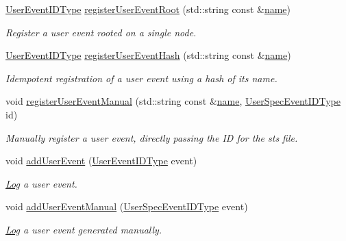\begin{DoxyCompactItemize}
\hyperlink{namespacevt_1_1trace_a5908920d051c144c89f17c69ed262350}{User\+Event\+I\+D\+Type} \hyperlink{structvt_1_1trace_1_1_trace_a99fcca49a5506c3ee5cda67e541e37cc}{register\+User\+Event\+Root} (std\+::string const \&\hyperlink{structvt_1_1trace_1_1_trace_aaae4bbf6d009229a5c8b9db67a127942}{name})
\begin{DoxyCompactList}\small\item\em Register a user event rooted on a single node. \end{DoxyCompactList}\item 
\hyperlink{namespacevt_1_1trace_a5908920d051c144c89f17c69ed262350}{User\+Event\+I\+D\+Type} \hyperlink{structvt_1_1trace_1_1_trace_a1b80a8ca6bebbfbe61f8b119342e14f7}{register\+User\+Event\+Hash} (std\+::string const \&\hyperlink{structvt_1_1trace_1_1_trace_aaae4bbf6d009229a5c8b9db67a127942}{name})
\begin{DoxyCompactList}\small\item\em Idempotent registration of a user event using a hash of its name. \end{DoxyCompactList}\item 
void \hyperlink{structvt_1_1trace_1_1_trace_ade8d39718f60924f1aeb178ccda56cbc}{register\+User\+Event\+Manual} (std\+::string const \&\hyperlink{structvt_1_1trace_1_1_trace_aaae4bbf6d009229a5c8b9db67a127942}{name}, \hyperlink{namespacevt_1_1trace_a70c43e0e1596eea236912d4197d3120a}{User\+Spec\+Event\+I\+D\+Type} id)
\begin{DoxyCompactList}\small\item\em Manually register a user event, directly passing the ID for the sts file. \end{DoxyCompactList}\item 
void \hyperlink{structvt_1_1trace_1_1_trace_a0a4bbdf7bd3c2b8742cbceb24389a4c0}{add\+User\+Event} (\hyperlink{namespacevt_1_1trace_a5908920d051c144c89f17c69ed262350}{User\+Event\+I\+D\+Type} event)
\begin{DoxyCompactList}\small\item\em \hyperlink{structvt_1_1trace_1_1_log}{Log} a user event. \end{DoxyCompactList}\item 
void \hyperlink{structvt_1_1trace_1_1_trace_a2d9fac6bd71ba67e4f87b7efd7c6c6c7}{add\+User\+Event\+Manual} (\hyperlink{namespacevt_1_1trace_a70c43e0e1596eea236912d4197d3120a}{User\+Spec\+Event\+I\+D\+Type} event)
\begin{DoxyCompactList}\small\item\em \hyperlink{structvt_1_1trace_1_1_log}{Log} a user event generated manually. \end{DoxyCompactList}\item 

\end{DoxyCompactItemize}
